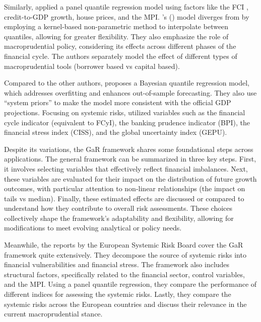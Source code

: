 \documentclass[12pt,a4paper]{article}
\begin{document}
Similarly, \citet{galan2020} applied a panel quantile regression model using factors like the FCI \citet{koop_2013}, credit-to-GDP growth, house prices, and the MPI. \citeauthor{galan2020}'s (\citeyear{galan2020}) model diverges from \citet{adrian_2019} by employing a kernel-based non-parametric method to interpolate between quantiles, allowing for greater flexibility. They also emphasize the role of macroprudential policy, considering its effects across different phases of the financial cycle. The authors separately model the effect of different types of macroprudential tools (borrower based vs capital based).

Compared to the other authors, \citet{szabo2020} proposes a Bayesian quantile regression model, which addresses overfitting and enhances out-of-sample forecasting. They also use ``system priors'' to make the model more consistent with the official GDP projections. Focusing on systemic risks, \citet{szabo2020} utilized variables such as the financial cycle indicator (equivalent to FCyI), the banking prudence indicator (BPI), the financial stress index (CISS), and the global uncertainty index (GEPU).

Despite its variations, the GaR framework shares some foundational steps across applications. The general framework can be summarized in three key steps. First, it involves selecting variables that effectively reflect financial imbalances. Next, these variables are evaluated for their impact on the distribution of future growth outcomes, with particular attention to non-linear relationships (the impact on tails vs median). Finally, these estimated effects are discussed or compared to understand how they contribute to overall risk assessments. These choices collectively shape the framework's adaptability and flexibility, allowing for modifications to meet evolving analytical or policy needs.

Meanwhile, the reports by the European Systemic Risk Board \citep{esrb2018, esrb2019, esrb2021, esrb2024} cover the GaR framework quite extensively. They decompose the source of systemic risks into financial vulnerabilities and financial stress. The framework also includes structural factors, specifically related to the financial sector, control variables, and the MPI. Using a panel quantile regression, they compare the performance of different indices for assessing the systemic risks. Lastly, they compare the systemic risks across the European countries and discuss their relevance in the current macroprudential stance.
\end{document}
